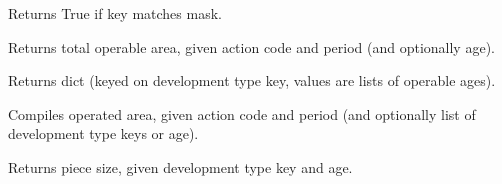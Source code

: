 \documentclass[letterpaper,10pt,english]{sphinxmanual}
\begin{document}
\begin{fulllineitems}
\begin{fulllineitems}
\end{fulllineitems}


\begin{fulllineitems}
\label{\detokenize{forest:forest.ForestModel.match_mask}}
Returns True if key matches mask.

\end{fulllineitems}


\begin{fulllineitems}
\label{\detokenize{forest:forest.ForestModel.operable_area}}
Returns total operable area, given action code and period (and optionally age).

\end{fulllineitems}


\begin{fulllineitems}
\label{\detokenize{forest:forest.ForestModel.operable_dtypes}}
Returns dict (keyed on development type key, values are lists of operable ages).

\end{fulllineitems}


\begin{fulllineitems}
\label{\detokenize{forest:forest.ForestModel.operated_area}}
Compiles operated area, given action code and period (and optionally list of development type keys or age).

\end{fulllineitems}


\begin{fulllineitems}
\label{\detokenize{forest:forest.ForestModel.piece_size}}
Returns piece size, given development type key and age.


\end{fulllineitems}
\end{fulllineitems}
\end{document}
